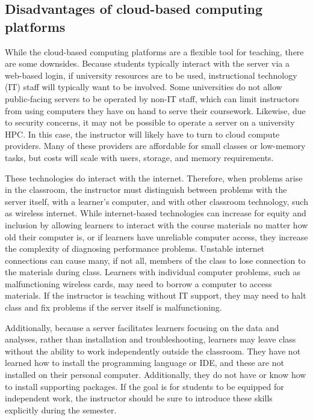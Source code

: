 \subsection{Disadvantages of cloud-based computing platforms}\label{subsub:cloud-disdvantage}

While the cloud-based computing platforms are a flexible tool for teaching, there are some downsides.
Because students typically interact with the server via a web-based login, if university resources are to be used, 
instructional technology (IT) staff will typically want to be involved.
Some universities do not allow public-facing servers to be operated by non-IT staff, which can 
limit instructors from using computers they have on hand to serve their coursework.
Likewise, due to security concerns, it may not be possible to operate a server on a university HPC.
In this case, the instructor will likely have to turn to cloud compute providers.
Many of these providers are affordable for small classes or low-memory tasks, but costs will scale with users, storage, and memory requirements.

These technologies do interact with the internet.
Therefore, when problems arise in the classroom, the instructor must distinguish between problems with the server itself, with a 
learner's computer, and with other classroom technology, such as wireless internet.
While internet-based technologies can increase for equity and inclusion by allowing learners to 
interact with the course materials no matter how old their computer is, or if learners have unreliable computer access, 
they increase the complexity of diagnosing performance problems.
Unstable internet connections can cause many, if not all, members of the class to lose connection to the materials during class.
Learners with individual computer problems, such as malfunctioning wireless cards, may need to borrow a computer to access materials. 
If the instructor is teaching without IT support, they may need to halt class and fix problems if the server itself is malfunctioning.

Additionally, because a server facilitates learners focusing on the data
and analyses, rather than installation and troubleshooting, learners may leave
class without the ability to work independently outside the classroom.
They have not learned how to install the programming language or IDE, and these 
are not installed on their personal computer.
Additionally, they do not have or know how to install supporting packages.
If the goal is for students to be equipped for independent work, the instructor should be sure to introduce these skills explicitly during the semester.


